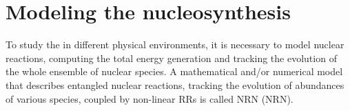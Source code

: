 





\section{Modeling the nucleosynthesis}\label{sec:nucleo:method}

%
To study the \nuc{} in different physical environments, it is necessary to 
model nuclear reactions, computing the total energy generation 
\citep[\eg][]{Weaver:1978,Mueller:1986,Timmes:1999} and tracking the 
evolution of the whole ensemble of nuclear species. A mathematical and/or 
numerical model that describes entangled nuclear reactions, tracking the 
evolution of abundances of various species, coupled by non-linear 
\acp{RR} is called \acl{NRN} (\acs{NRN}). %

